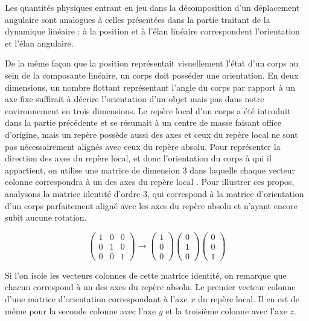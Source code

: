 Les quantités physiques entrant en jeu dans la décomposition d'un
déplacement angulaire sont analogues à celles présentées dans la
partie traitant de la dynamique linéaire : à la position et à l'élan
linéaire correspondent l'orientation et l'élan angulaire.

De la même façon que la position représentait visuellement l'état d'un
corps au sein de la composante linéaire, un corps doit posséder une
orientation. En deux dimensions, un nombre flottant représentant
l'angle du corps par rapport à un axe fixe suffirait à décrire
l'orientation d'un objet mais pas dans notre environnement en trois
dimensions. Le repère local d'un corps a été introduit dans la partie
précédente et se résumait à un centre de masse faisant office
d'origine, mais un repère possède aussi des axes et ceux du repère
local ne sont pas nécessairement alignés avec ceux du repère
absolu. Pour représenter la direction des axes du repère local, et
donc l'orientation du corps à qui il appartient, on utilise une
matrice de dimension 3 dans laquelle chaque vecteur colonne
correspondra à un des axes du repère local \cite{witkit}. Pour
illustrer ces propos, analysons la matrice identité d'ordre 3, qui
correspond à la matrice d'orientation d'un corps parfaitement aligné
avec les axes du repère absolu et n'ayant encore subit aucune
rotation.

\[
\begin{pmatrix}
  1 & 0 & 0 \\ 0 & 1 & 0 \\ 0 & 0 & 1
\end{pmatrix}
\rightarrow
\begin{pmatrix}
  1 \\ 0 \\ 0
\end{pmatrix}
\begin{pmatrix}
  0 \\ 1 \\ 0
\end{pmatrix}
\begin{pmatrix}
  0 \\ 0 \\ 1
\end{pmatrix}
\]

Si l'on isole les vecteurs colonnes de cette matrice identité, on
remarque que chacun correspond à un des axes du repère absolu. Le
premier vecteur colonne d'une matrice d'orientation correspondant à
l'axe $x$ du repère local. Il en est de même pour la seconde colonne
avec l'axe $y$ et la troisième colonne avec l'axe $z$.

